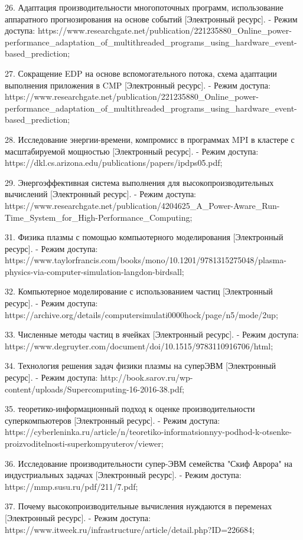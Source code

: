 \documentclass{article}
\begin{document}
26. Адаптация производительности многопоточных программ, использование аппаратного прогнозирования на основе событий [Электронный ресурс].
   - Режим доступа: https://www.researchgate.net/publication/221235880_Online_power-performance_adaptation_of_multithreaded_programs_using_hardware_event-based_prediction;

27. Сокращение EDP на основе вспомогательного потока, схема адаптации выполнения приложения в CMP [Электронный ресурс].
   - Режим доступа: https://www.researchgate.net/publication/221235880_Online_power-performance_adaptation_of_multithreaded_programs_using_hardware_event-based_prediction;

28. Исследование энергии-времени, компромисс в программах MPI в кластере с масштабируемой мощностью [Электронный ресурс].
   - Режим доступа: https://dkl.cs.arizona.edu/publications/papers/ipdps05.pdf;

29. Энергоэффективная система выполнения для высокопроизводительных вычислений [Электронный ресурс].
   - Режим доступа: https://www.researchgate.net/publication/4204625_A_Power-Aware_Run-Time_System_for_High-Performance_Computing;

31. Физика плазмы с помощью компьютерного моделирования [Электронный ресурс].
   - Режим доступа: https://www.taylorfrancis.com/books/mono/10.1201/9781315275048/plasma-physics-via-computer-simulation-langdon-birdsall;

32. Компьютерное моделирование с использованием частиц [Электронный ресурс].
   - Режим доступа: https://archive.org/details/computersimulati0000hock/page/n5/mode/2up;

33. Численные методы частиц в ячейках [Электронный ресурс].
   - Режим доступа: https://www.degruyter.com/document/doi/10.1515/9783110916706/html;

34. Технология решения задач физики плазмы на суперЭВМ [Электронный ресурс].
   - Режим доступа: http://book.sarov.ru/wp-content/uploads/Supercomputing-16-2016-38.pdf;

35. теоретико-информационный подход к оценке производительности суперкомпьютеров [Электронный ресурс].
   - Режим доступа: https://cyberleninka.ru/article/n/teoretiko-informatsionnyy-podhod-k-otsenke-proizvoditelnosti-superkompyuterov/viewer;

36. Исследование производительности супер-ЭВМ семейства "Скиф Аврора" на индустриальных задачах [Электронный ресурс].
   - Режим доступа: https://mmp.susu.ru/pdf/211/7.pdf;

37. Почему высокопроизводительные вычисления нуждаются в переменах [Электронный ресурс].
   - Режим доступа: https://www.itweek.ru/infrastructure/article/detail.php?ID=226684;
\end{document}
